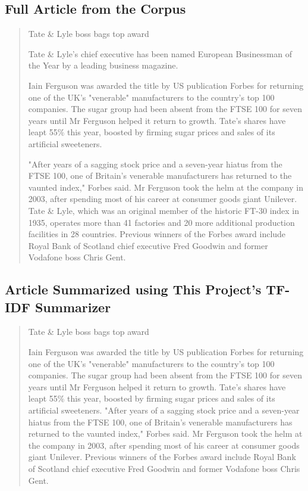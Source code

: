 \documentclass{IEEEtran}
\begin{document}
\subsection{Full Article from the Corpus}
\begin{quotation}
Tate \& Lyle boss bags top award

Tate \& Lyle's chief executive has been named European Businessman of the Year by a leading business magazine.

Iain Ferguson was awarded the title by US publication Forbes for returning one of the UK's "venerable" manufacturers to the country's top 100 companies. The sugar group had been absent from the FTSE 100 for seven years until Mr Ferguson helped it return to growth. Tate's shares have leapt 55\% this year, boosted by firming sugar prices and sales of its artificial sweeteners.

"After years of a sagging stock price and a seven-year hiatus from the FTSE 100, one of Britain's venerable manufacturers has returned to the vaunted index," Forbes said. Mr Ferguson took the helm at the company in 2003, after spending most of his career at consumer goods giant Unilever. Tate \& Lyle, which was an original member of the historic FT-30 index in 1935, operates more than 41 factories and 20 more additional production facilities in 28 countries. Previous winners of the Forbes award include Royal Bank of Scotland chief executive Fred Goodwin and former Vodafone boss Chris Gent.
\label{quotation:non-summarized}
\end{quotation}

\subsection{Article Summarized using This Project's TF-IDF Summarizer}
\begin{quotation}
Tate \& Lyle boss bags top award

Iain Ferguson was awarded the title by US publication Forbes for returning one of the UK's "venerable" manufacturers to the country's top 100 companies. The sugar group had been absent from the FTSE 100 for seven years until Mr Ferguson helped it return to growth. Tate's shares have leapt 55\% this year, boosted by firming sugar prices and sales of its artificial sweeteners. "After years of a sagging stock price and a seven-year hiatus from the FTSE 100, one of Britain's venerable manufacturers has returned to the vaunted index," Forbes said. Mr Ferguson took the helm at the company in 2003, after spending most of his career at consumer goods giant Unilever. Previous winners of the Forbes award include Royal Bank of Scotland chief executive Fred Goodwin and former Vodafone boss Chris Gent.
\label{quotation:tfidf-summarized}
\end{quotation}
\end{document}
